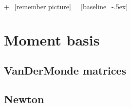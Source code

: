%
%
%
%
%

\date{January 7 2008}



+=[remember picture]
 = [baseline=-.5ex]

\everymath{\displaystyle}

\subtitle{}

\begin{frame}
  \maketitle
\end{frame}

\begin{frame}
  \tableofcontents
\end{frame}

\section[Moment]{Moment basis}
\label{sec:moment-basis}

\subsection[Van Der Monde]{VanDerMonde matrices}
\label{sec:vandermonde-matrices}

\begin{frame}{}
  
\end{frame}


\subsection{Newton}
\label{sec:newton}

\begin{frame}{}
  
\end{frame}

